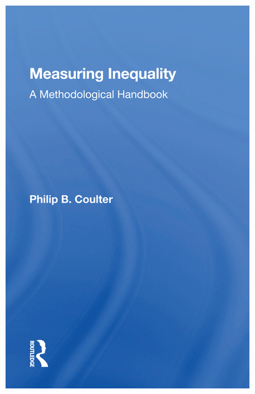 \documentclass[aspectratio=169]{beamer}
\begin{document}
\begin{frame}

\begin{center}
  \includegraphics[height=0.9\textheight]{figures/coulter_measuring_1989_cover.jpg}
\end{center}

\end{frame}
\end{document}
